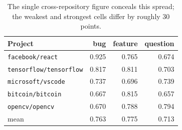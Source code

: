 \begin{table}[htbp]
\centering
\caption{Per-project, per-class F1 of the strongest model (\texttt{linear\_svm}).}
\label{tab:perrepoclass}
\begin{tabular}{lrrr}
\toprule
Project & bug & feature & question \\
\midrule
\texttt{facebook/react} & 0.925 & 0.765 & 0.674 \\
\texttt{tensorflow/tensorflow} & 0.817 & 0.811 & 0.703 \\
\texttt{microsoft/vscode} & 0.737 & 0.696 & 0.739 \\
\texttt{bitcoin/bitcoin} & 0.667 & 0.815 & 0.657 \\
\texttt{opencv/opencv} & 0.670 & 0.788 & 0.794 \\
\midrule
mean & 0.763 & 0.775 & 0.713 \\
\bottomrule
\end{tabular}
\caption*{\footnotesize The single cross-repository figure conceals this spread; the weakest and strongest cells differ by roughly 30 points.}
\end{table}
